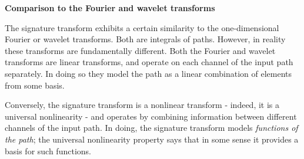 \documentclass{article}
\renewcommand{\subsubsection}[1]{\textbf{#1}

} %
\begin{document}
\subsubsection{Comparison to the Fourier and wavelet transforms}\label{sec: comparison fourier}
The signature transform exhibits a certain similarity to the one-dimensional Fourier or wavelet transforms. Both are integrals of paths. However, in reality these transforms are fundamentally different. Both the Fourier and wavelet transforms are linear transforms, and operate on each channel of the input path separately. In doing so they model the path as a linear combination of elements from some basis.

Conversely, the signature transform is a nonlinear transform - indeed, it is a universal nonlinearity - and operates by combining information between different channels of the input path. In doing, the signature transform models \emph{functions of the path}; the universal nonlinearity property says that in some sense it provides a basis for such functions.
\end{document}
